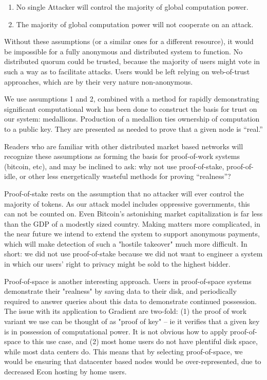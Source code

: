 \documentclass{article}
\begin{document}
\begin{enumerate}
    \item No single Attacker will control the majority of global computation power.
    \item The majority of global computation power will not cooperate on an attack.
\end{enumerate}

Without these assumptions (or a similar ones for a different resource), it would be impossible for a fully anonymous and distributed system to function. No distributed quorum could be trusted, because the majority of users might vote in such a way as to facilitate attacks. Users would be left relying on web-of-trust approaches, which are by their very nature non-anonymous.

We use assumptions 1 and 2, combined with a method for rapidly demonstrating significant computational work has been done to construct the basis for trust on our system: medallions. Production of a medallion ties ownership of computation to a public key. They are presented as needed to prove that a given node is “real.”

Readers who are familiar with other distributed market based networks will recognize these assumptions as forming the basis for proof-of-work systems (bitcoin, etc), and may be inclined to ask: why not use proof-of-stake, proof-of-idle, or other less energetically wasteful methods for proving “realness”?

Proof-of-stake rests on the assumption that no attacker will ever control the majority of tokens. As our attack model includes oppressive governments, this can not be counted on. Even Bitcoin’s astonishing market capitalization is far less than the GDP of a modestly sized country. Making matters more complicated, in the near future we intend to extend the system to support anonymous payments, which will make detection of such a "hostile takeover" much more difficult. In short: we did not use proof-of-stake because we did not want to engineer a system in which our users’ right to privacy might be sold to the highest bidder.

Proof-of-space is another interesting approach. Users in proof-of-space systems demonstrate their "realness" by saving data to their disk, and periodically required to answer queries about this data to demonstrate continued possession. The issue with its application to Gradient are two-fold: (1) the proof of work variant we use can be thought of as "proof of key" -- ie it verifies that a given key is in possession of computational power. It is not obvious how to apply proof-of-space to this use case, and (2) most home users do not have plentiful disk space, while most data centers do. This means that by selecting proof-of-space, we would be ensuring that datacenter based nodes would be over-represented, due to decreased Econ hosting by home users.
\end{document}
